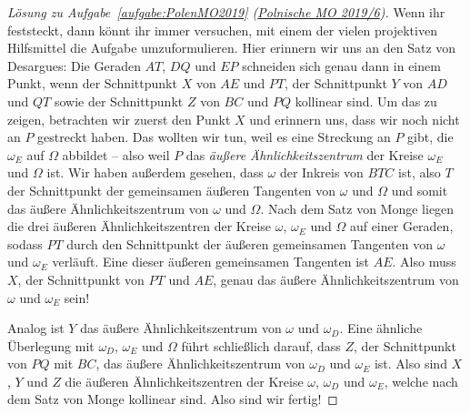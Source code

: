 \begin{proof}[Lösung zu Aufgabe~\ref{aufgabe:PolenMO2019} \textmd{(\href{https://artofproblemsolving.com/community/c904216_2019_polish_mo_finals}{Polnische MO 2019/6})}]
	Wenn ihr feststeckt, dann könnt ihr immer versuchen, mit einem der vielen projektiven Hilfsmittel die Aufgabe umzuformulieren. Hier erinnern wir uns an den Satz von Desargues: Die Geraden $AT$, $DQ$ und $EP$ schneiden sich genau dann in einem Punkt, wenn der Schnittpunkt $X$ von $AE$ und $PT$, der Schnittpunkt $Y$ von $AD$ und $QT$ sowie der Schnittpunkt $Z$ von $BC$ und $PQ$ kollinear sind. Um das zu zeigen, betrachten wir zuerst den Punkt $X$ und erinnern uns, dass wir noch nicht an $P$ gestreckt haben. Das wollten wir tun, weil es eine Streckung an $P$ gibt, die $\omega_E$ auf $\Omega$ abbildet -- also weil $P$ das \emph{äußere Ähnlichkeitszentrum} der Kreise $\omega_E$ und $\Omega$ ist. Wir haben außerdem gesehen, dass $\omega$ der Inkreis von $BTC$ ist, also $T$ der Schnittpunkt der gemeinsamen äußeren Tangenten von $\omega$ und $\Omega$ und somit das äußere Ähnlichkeitszentrum von $\omega$ und $\Omega$. Nach dem Satz von Monge liegen die drei äußeren Ähnlichkeitszentren der Kreise $\omega$, $\omega_E$ und $\Omega$ auf einer Geraden, sodass $PT$ durch den Schnittpunkt der äußeren gemeinsamen Tangenten von $\omega$ und $\omega_E$ verläuft. Eine dieser äußeren gemeinsamen Tangenten ist $AE$. Also muss $X$, der Schnittpunkt von $PT$ und $AE$, genau das äußere Ähnlichkeitszentrum von $\omega$ und $\omega_E$ sein!
	
	Analog ist $Y$ das äußere Ähnlichkeitszentrum von $\omega$ und $\omega_D$. Eine ähnliche Überlegung mit $\omega_D$, $\omega_E$ und $\Omega$ führt schließlich darauf, dass $Z$, der Schnittpunkt von $PQ$ mit $BC$, das äußere Ähnlichkeitszentrum von $\omega_D$ und $\omega_E$ ist. Also sind $X$, $Y$ und $Z$ die äußeren Ähnlichkeitszentren der Kreise $\omega$, $\omega_D$ und $\omega_E$, welche nach dem Satz von Monge kollinear sind. Also sind wir fertig!
\end{proof}